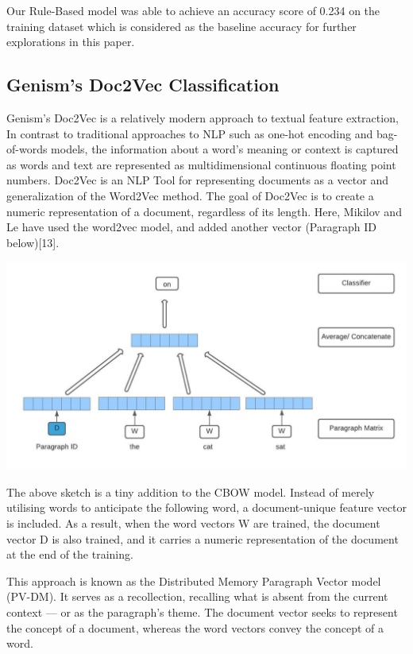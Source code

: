 \documentclass[twocolumn]{article}
\begin{document}
Our Rule-Based model was able to achieve an accuracy score of 0.234 on the training dataset which is considered as the baseline accuracy for further explorations in this paper.\par

\subsection{Genism's Doc2Vec Classification}
Genism's Doc2Vec is a relatively modern approach to textual feature extraction, In contrast to traditional approaches to NLP such as one-hot encoding and bag-of-words models, the information about a word's meaning or context is captured as words and text are represented as multidimensional continuous floating point numbers. Doc2Vec is an NLP Tool for representing documents as a vector and generalization of the Word2Vec method. The goal of Doc2Vec is to create a numeric representation of a document, regardless of its length. Here, Mikilov and Le have used the word2vec model, and added another vector (Paragraph ID below)[13].\par
\begin{center}
\hspace*{-0.4cm}
\includegraphics[scale=0.5]{Doc2Vec.jpeg}
\end{center}

The above sketch is a tiny addition to the CBOW model. Instead of merely utilising words to anticipate the following word, a document-unique feature vector is included. As a result, when the word vectors W are trained, the document vector D is also trained, and it carries a numeric representation of the document at the end of the training. \par 

This approach is known as the Distributed Memory Paragraph Vector model (PV-DM). It serves as a recollection, recalling what is absent from the current context — or as the paragraph's theme. The document vector seeks to represent the concept of a document, whereas the word vectors convey the concept of a word. \par 
\end{document}
